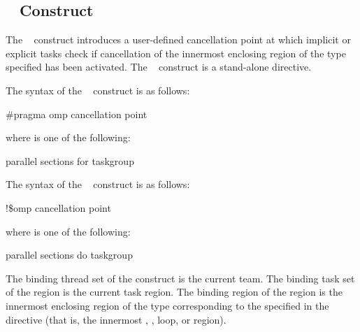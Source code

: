 \subsection{~ Construct}
\label{subsec:cancellation point Construct}
\summary
The ~ construct introduces a user-defined cancellation point at 
which implicit or explicit tasks check if cancellation of the innermost enclosing region 
of the type specified has been activated. The ~ construct is a 
stand-alone directive.

\syntax
\ccppspecificstart
The syntax of the ~ construct is as follows:

\begin{boxedcode}
\#pragma omp cancellation point 
\end{boxedcode}

where  is one of the following:

\begin{indentedcodelist}
parallel
sections
for
taskgroup
\end{indentedcodelist}
\ccppspecificend

\fortranspecificstart
The syntax of the ~ construct is as follows:

\begin{boxedcode}
!\$omp cancellation point 
\end{boxedcode}

where  is one of the following:

\begin{indentedcodelist}
parallel
sections
do
taskgroup
\end{indentedcodelist}
\fortranspecificend

\binding
The binding thread set of the  construct is the current team.
The binding task set of the  region is the current task region. 
The binding region of the  region is the innermost enclosing region of the type corresponding to the  
specified in the directive (that is, the innermost , , loop, or 
 region).

